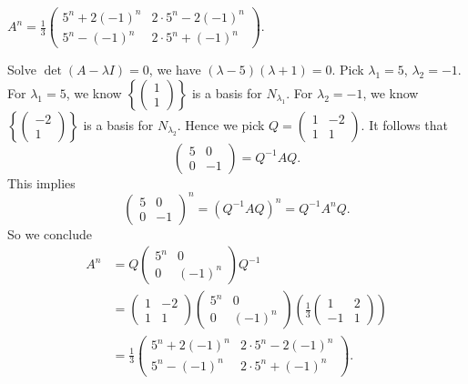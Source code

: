 \begin{Exercise}
	\begin{answer}
		$A^n = \frac{1}{3}\begin{pmatrix}
		5^n+2(-1)^n & 2\cdot 5^n - 2(-1)^n \\
		5^n-(-1)^n & 2\cdot 5^n + (-1)^n
		\end{pmatrix}$.
	\end{answer}
	\begin{solution}
		Solve $\det(A-\lambda I) = 0$, we have $(\lambda-5)(\lambda+1) = 0$. Pick $\lambda_1 = 5$, $\lambda_2 = -1$. For $\lambda_1 = 5$, we know $\left\{\begin{pmatrix}
		1 \\
		1
		\end{pmatrix}\right\}$ is a basis for $N_{\lambda_1}$. For $\lambda_2 = -1$, we know $\left\{\begin{pmatrix}
		-2 \\
		1
		\end{pmatrix}\right\}$ is a basis for $N_{\lambda_2}$. Hence we pick $Q = \begin{pmatrix}
		1 & -2 \\
		1 & 1
		\end{pmatrix}$. It follows that
		$$
		\begin{pmatrix}
		5 & 0 \\
		0 & -1
		\end{pmatrix} = Q^{-1} A Q.
		$$
		This implies
		$$
		\begin{pmatrix}
		5 & 0 \\
		0 & -1
		\end{pmatrix}^n = (Q^{-1} A Q)^n = Q^{-1} A^n Q.
		$$
		So we conclude
		\begin{align*}
		A^n 
		&= Q \begin{pmatrix}
		5^n & 0 \\
		0 & (-1)^n
		\end{pmatrix} Q^{-1} \\ 
		&= \begin{pmatrix}
		1 & -2 \\
		1 & 1
		\end{pmatrix} \begin{pmatrix}
		5^n & 0 \\
		0 & (-1)^n
		\end{pmatrix} \left( \frac{1}{3}\begin{pmatrix}
		1 & 2 \\
		-1 & 1
		\end{pmatrix} \right) \\
		&= \frac{1}{3}\begin{pmatrix}
		5^n+2(-1)^n & 2\cdot 5^n - 2(-1)^n \\
		5^n-(-1)^n & 2\cdot 5^n + (-1)^n
		\end{pmatrix}.
		\end{align*}
	\end{solution}
\end{Exercise}